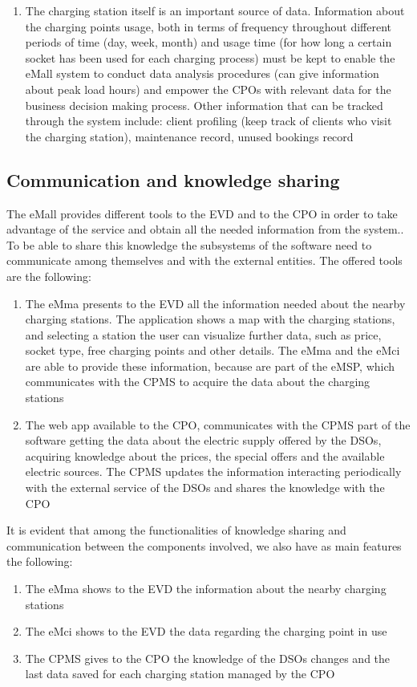 \begin{enumerate}
    \item The charging station itself is an important source of data. Information about the charging points usage, both in terms of frequency throughout different periods of time (day, week, month) and usage time (for how long a certain socket has been used for each charging process) must be kept to enable the eMall system to conduct data analysis procedures (can give information about peak load hours) and empower the CPOs with relevant data for the business decision making process. Other information that can be tracked through the system include: client profiling (keep track of clients who visit the charging station), maintenance record, unused bookings record
\end{enumerate}

\subsection{Communication and knowledge sharing}
The eMall provides different tools to the EVD and to the CPO in order to take advantage of the service and obtain all the needed information from the system.. To be able to share this knowledge the subsystems of the software need to communicate among themselves and with the external entities. The offered tools are the following:
\begin{enumerate}
    \item The eMma presents to the EVD all the information needed about the nearby charging stations. The application shows a map with the charging stations, and selecting a station the user can visualize further data, such as price, socket type, free charging points and other details. The eMma and the eMci are able to provide these information, because are part of the eMSP, which communicates with the CPMS to acquire the data about the charging stations 
    \item The web app available to the CPO, communicates with the CPMS part of the software getting the data about the electric supply offered by the DSOs, acquiring knowledge about the prices, the special offers and the available electric sources. The CPMS updates the information interacting periodically with the external service of the DSOs and shares the knowledge with the CPO
\end{enumerate}
It is evident that among the functionalities of knowledge sharing and communication between the components involved, we also have as main features the following:
\begin{enumerate}
    \item The eMma shows to the EVD the information about the nearby charging stations
    \item The eMci shows to the EVD the data regarding the charging point in use
    \item The CPMS gives to the CPO the knowledge of the DSOs changes and the last data saved for each charging station managed by the CPO
\end{enumerate}

